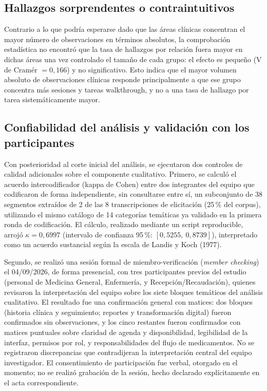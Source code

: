 \documentclass[runningheads]{llncs}
\begin{document}
	\subsection{Hallazgos sorprendentes o contraintuitivos}
	Contrario a lo que podría esperarse dado que las áreas clínicas concentran el mayor número de observaciones en términos absolutos, la comprobación estadística no encontró que la tasa de hallazgos por relación fuera mayor en dichas áreas una vez controlado el tamaño de cada grupo: el efecto es pequeño (V de Cramér $=0{,}166$) y no significativo. Esto indica que el mayor volumen absoluto de observaciones clínicas responde principalmente a que ese grupo concentra más sesiones y tareas walkthrough, y no a una tasa de hallazgo por tarea sistemáticamente mayor.
	
	\subsection{Confiabilidad del análisis y validación con los participantes}
	Con posterioridad al corte inicial del análisis, se ejecutaron dos controles de calidad adicionales sobre el componente cualitativo. Primero, se calculó el acuerdo intercodificador (kappa de Cohen) entre dos integrantes del equipo que codificaron de forma independiente, sin consultarse entre sí, un subconjunto de 38 segmentos extraídos de 2 de las 8 transcripciones de elicitación (25\,\% del corpus), utilizando el mismo catálogo de 14 categorías temáticas ya validado en la primera ronda de codificación. El cálculo, realizado mediante un script reproducible, arrojó $\kappa=0{,}6997$ (intervalo de confianza 95\,\%: $[0{,}5255,\ 0{,}8739]$), interpretado como un acuerdo sustancial según la escala de Landis y Koch (1977).
	
	Segundo, se realizó una sesión formal de miembro-verificación (\emph{member checking}) el 04/09/2026, de forma presencial, con tres participantes previos del estudio (personal de Medicina General, Enfermería, y Recepción/Recaudación), quienes revisaron la interpretación del equipo sobre los siete bloques temáticos del análisis cualitativo. El resultado fue una confirmación general con matices: dos bloques (historia clínica y seguimiento; reportes y transformación digital) fueron confirmados sin observaciones, y los cinco restantes fueron confirmados con matices puntuales sobre claridad de agenda y disponibilidad, legibilidad de la interfaz, permisos por rol, y responsabilidades del flujo de medicamentos. No se registraron discrepancias que contradijeran la interpretación central del equipo investigador. El consentimiento de participación fue verbal, otorgado en el momento; no se realizó grabación de la sesión, hecho declarado explícitamente en el acta correspondiente.
	
\end{document}
